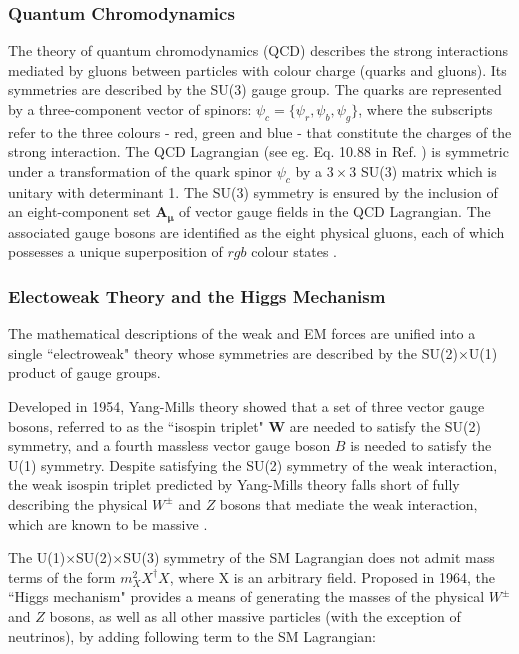 \subsubsection{Quantum Chromodynamics}

The theory of quantum chromodynamics (QCD) \cite{qcd_2007} describes the strong interactions mediated by gluons between particles with colour charge (quarks and gluons). Its symmetries are described by the SU(3) gauge group. The quarks are represented by a three-component vector of spinors: \(\psi_c = \{\psi_r, \psi_b, \psi_g\}\), where the subscripts refer to the three colours - red, green and blue - that constitute the charges of the strong interaction. The QCD Lagrangian (see eg. Eq. 10.88 in Ref. \cite{griffiths_2008}) is symmetric under a transformation of the quark spinor \(\psi_c\) by a \(3\times3\) SU(3) matrix which is unitary with determinant 1. The SU(3) symmetry is ensured by the inclusion of an eight-component set \(\boldsymbol{\boldsymbol{A}_\mu}\) of vector gauge fields in the QCD Lagrangian. The associated gauge bosons are identified as the eight physical gluons, each of which possesses a unique superposition of \({rgb}\) colour states \cite{griffiths_2008}.

\subsubsection{Electoweak Theory and the Higgs Mechanism}

The mathematical descriptions of the weak and EM forces are unified into a single ``electroweak" \cite{electroweak_2012} theory whose symmetries are described by the SU(2)\(\times\)U(1) product of gauge groups. 

Developed in 1954, Yang-Mills theory \cite{yang_mills_1954} showed that a set of three vector gauge bosons, referred to as the ``isospin triplet" \(\boldsymbol{W}\) are needed to satisfy the SU(2) symmetry, and a fourth massless vector gauge boson \(B\) is needed to satisfy the U(1) symmetry. Despite satisfying the SU(2) symmetry of the weak interaction, the weak isospin triplet predicted by Yang-Mills theory falls short of fully describing the physical \(W^{\pm}\) and \(Z\) bosons that mediate the weak interaction, which are known to be massive \cite{pdg_2018}.

The U(1)\(\times\)SU(2)\(\times\)SU(3) symmetry of the SM Lagrangian does not admit mass terms of the form \(m_X^2X^\dagger X\), where X is an arbitrary field. Proposed in 1964, the ``Higgs mechanism" \cite{HiggsTheory1,HiggsTheory2,HiggsTheory3} provides a means of generating the masses of the physical \(W^\pm\) and \(Z\) bosons, as well as all other massive particles (with the exception of neutrinos), by adding following term to the SM Lagrangian:

